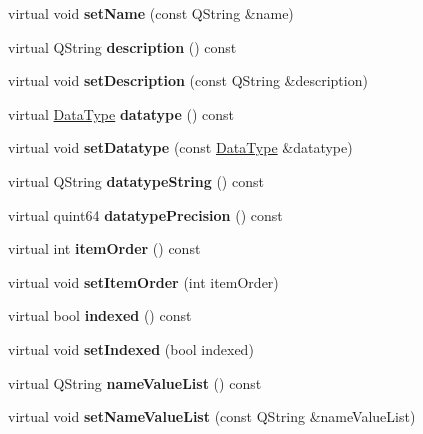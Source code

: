 \begin{DoxyCompactItemize}
virtual void {\bfseries set\+Name} (const Q\+String \&name)
\item 
\mbox{\label{class_structure_attribute_base_a93ddcdf887f53e7c3b8c53452e14064f}} 
virtual Q\+String {\bfseries description} () const
\item 
\mbox{\label{class_structure_attribute_base_a9c603704f31c68c5af818097b3b53510}} 
virtual void {\bfseries set\+Description} (const Q\+String \&description)
\item 
\mbox{\label{class_structure_attribute_base_a9ec030cbc704644792d75ea5bca3458f}} 
virtual \hyperlink{class_data_type}{Data\+Type} {\bfseries datatype} () const
\item 
\mbox{\label{class_structure_attribute_base_a9054ffacdfacb8237e319ce2484a985d}} 
virtual void {\bfseries set\+Datatype} (const \hyperlink{class_data_type}{Data\+Type} \&datatype)
\item 
\mbox{\label{class_structure_attribute_base_ac3fab77d2014ec6b570c8e77289eef3c}} 
virtual Q\+String {\bfseries datatype\+String} () const
\item 
\mbox{\label{class_structure_attribute_base_a09b50ea21ab4f17ab820551bdeecd707}} 
virtual quint64 {\bfseries datatype\+Precision} () const
\item 
\mbox{\label{class_structure_attribute_base_a432bdbafad90633d9eef91902d95b2ee}} 
virtual int {\bfseries item\+Order} () const
\item 
\mbox{\label{class_structure_attribute_base_a19398e5d17ebfb59ffc76ceb42522d17}} 
virtual void {\bfseries set\+Item\+Order} (int item\+Order)
\item 
\mbox{\label{class_structure_attribute_base_a3e769bf0352166ba4b771af3cff07a63}} 
virtual bool {\bfseries indexed} () const
\item 
\mbox{\label{class_structure_attribute_base_af64a01c82192c5e1cbab8af66d557927}} 
virtual void {\bfseries set\+Indexed} (bool indexed)
\item 
\mbox{\label{class_structure_attribute_base_a34dd656be8deb54d4eb641454b0628da}} 
virtual Q\+String {\bfseries name\+Value\+List} () const
\item 
\mbox{\label{class_structure_attribute_base_a1c0781f4c373eefa8df704c5fdea5396}} 
virtual void {\bfseries set\+Name\+Value\+List} (const Q\+String \&name\+Value\+List)
\end{DoxyCompactItemize}
